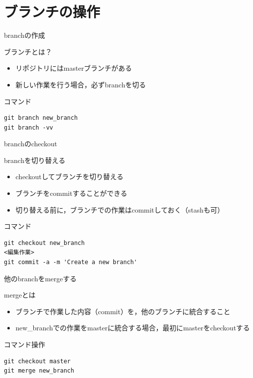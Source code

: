 \documentclass[t, aspectratio=169]{beamer}
\begin{document}
\section{ブランチの操作}
\label{sec-3-2}
\begin{frame}[fragile,label=sec-3-2-1]{branchの作成}
 \begin{block}{ブランチとは？}
\begin{itemize}
\item リポジトリにはmasterブランチがある
\item 新しい作業を行う場合，必ずbranchを切る
\end{itemize}
\end{block}

\begin{block}{コマンド}
\begin{verbatim}
git branch new_branch
git branch -vv
\end{verbatim}
\end{block}
\end{frame}
\begin{frame}[fragile,label=sec-3-2-2]{branchのcheckout}
 \begin{block}{branchを切り替える}
\begin{itemize}
\item checkoutしてブランチを切り替える
\item ブランチをcommitすることができる
\item 切り替える前に，ブランチでの作業はcommitしておく（stashも可）
\end{itemize}
\end{block}

\begin{block}{コマンド}
\begin{verbatim}
git checkout new_branch
<編集作業>
git commit -a -m 'Create a new branch'
\end{verbatim}
\end{block}
\end{frame}
\begin{frame}[fragile,label=sec-3-2-3]{他のbranchをmergeする}
 \begin{block}{mergeとは}
\begin{itemize}
\item ブランチで作業した内容（commit）を，他のブランチに統合すること
\item new\_branchでの作業をmasterに統合する場合，最初にmasterをcheckoutする
\end{itemize}
\end{block}

\begin{block}{コマンド操作}
\begin{verbatim}
git checkout master
git merge new_branch
\end{verbatim}
\end{block}
\end{frame}
\end{document}
